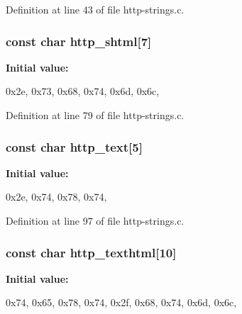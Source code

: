 Definition at line 43 of file http-\/strings.c.

\hypertarget{http-strings_8c_a52dc3e4726e77d123639f5a2ef5d82d8}{
\subsubsection[{http\_\-shtml}]{\setlength{\rightskip}{0pt plus 5cm}const char {\bf http\_\-shtml}\mbox{[}7\mbox{]}}}
\label{http-strings_8c_a52dc3e4726e77d123639f5a2ef5d82d8}
{\bfseries Initial value:}
\begin{DoxyCode}
 

{0x2e, 0x73, 0x68, 0x74, 0x6d, 0x6c, }
\end{DoxyCode}


Definition at line 79 of file http-\/strings.c.

\hypertarget{http-strings_8c_a03afa2e3239d727db67e1d943268bfbe}{
\subsubsection[{http\_\-text}]{\setlength{\rightskip}{0pt plus 5cm}const char {\bf http\_\-text}\mbox{[}5\mbox{]}}}
\label{http-strings_8c_a03afa2e3239d727db67e1d943268bfbe}
{\bfseries Initial value:}
\begin{DoxyCode}
 

{0x2e, 0x74, 0x78, 0x74, }
\end{DoxyCode}


Definition at line 97 of file http-\/strings.c.

\hypertarget{http-strings_8c_a0b945415ffe9889bcc9f876fbf332134}{
\subsubsection[{http\_\-texthtml}]{\setlength{\rightskip}{0pt plus 5cm}const char {\bf http\_\-texthtml}\mbox{[}10\mbox{]}}}
\label{http-strings_8c_a0b945415ffe9889bcc9f876fbf332134}
{\bfseries Initial value:}
\begin{DoxyCode}
 

{0x74, 0x65, 0x78, 0x74, 0x2f, 0x68, 0x74, 0x6d, 0x6c, }
\end{DoxyCode}


